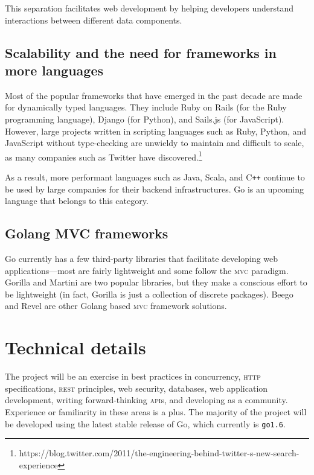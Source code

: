 \documentclass{article}
\begin{document}
This separation facilitates web development by helping developers understand interactions between different data components. 

\subsection{Scalability and the need for frameworks in more languages}
 
Most of the popular frameworks that have emerged in the past decade are made for dynamically typed languages. They include Ruby on Rails (for the Ruby programming language), Django (for Python), and Sails.js (for JavaScript). However, large projects written in scripting languages such as Ruby, Python, and JavaScript without type-checking are unwieldy to maintain and difficult to scale, as many companies such as Twitter have discovered.\footnote{{https://blog.twitter.com/2011/the-engineering-behind-twitter-s-new-search-experience}}

As a result, more performant languages such as Java, Scala, and C\texttt{++} continue to be used by large companies for their backend infrastructures. Go is an upcoming language that belongs to this category.

\subsection{Golang MVC frameworks}

Go currently has a few third-party libraries that facilitate developing web applications---most are fairly lightweight and some follow the \textsc{mvc} paradigm. Gorilla and Martini are two popular libraries, but they make a conscious effort to be lightweight (in fact, Gorilla is just a collection of discrete packages). Beego and Revel are other Golang based \textsc{mvc} framework solutions. 

\section{Technical details}

The project will be an exercise in best practices in concurrency, \textsc{http} specifications, \textsc{rest} principles, web security, databases, web application development, writing forward-thinking \textsc{api}s, and developing as a community. Experience or familiarity in these areas is a plus. The majority of the project will be developed using the latest stable release of Go, which currently is \texttt{go1.6}. 
\end{document}
